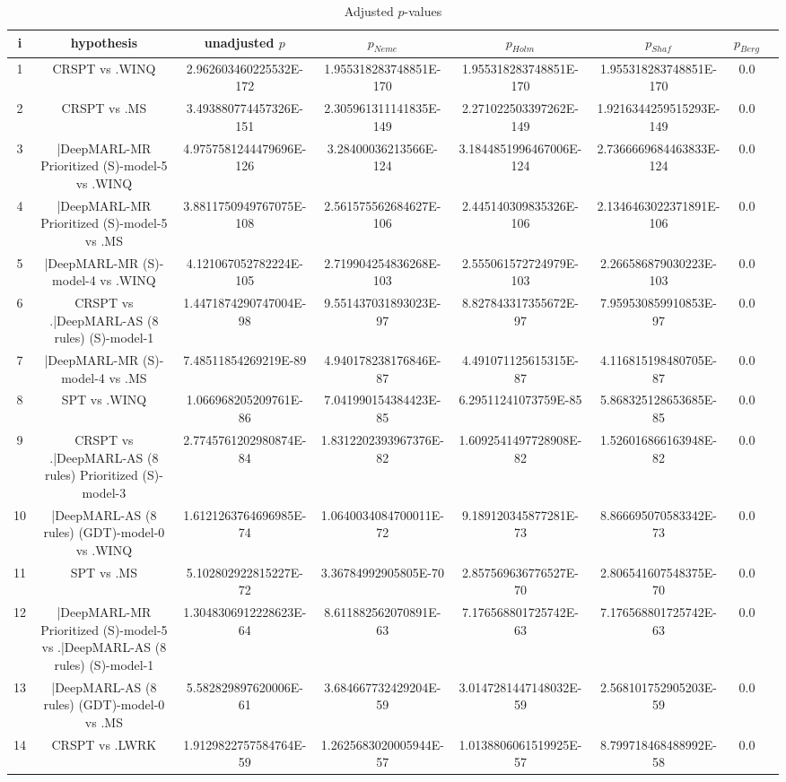\documentclass[a3paper,10pt]{article}
\begin{document}
\begin{table}[!htp]
\centering\tiny
\caption{Adjusted $p$-values}
\begin{tabular}{cccccccc}
i&hypothesis&unadjusted $p$&$p_{Neme}$&$p_{Holm}$&$p_{Shaf}$&$p_{Berg}$\\
\hline
1&CRSPT vs .WINQ&2.962603460225532E-172&1.955318283748851E-170&1.955318283748851E-170&1.955318283748851E-170&0.0\\
2&CRSPT vs .MS&3.493880774457326E-151&2.305961311141835E-149&2.271022503397262E-149&1.9216344259515293E-149&0.0\\
3&|DeepMARL-MR Prioritized (S)-model-5 vs .WINQ&4.9757581244479696E-126&3.28400036213566E-124&3.1844851996467006E-124&2.7366669684463833E-124&0.0\\
4&|DeepMARL-MR Prioritized (S)-model-5 vs .MS&3.8811750949767075E-108&2.561575562684627E-106&2.445140309835326E-106&2.1346463022371891E-106&0.0\\
5&|DeepMARL-MR (S)-model-4 vs .WINQ&4.121067052782224E-105&2.719904254836268E-103&2.555061572724979E-103&2.266586879030223E-103&0.0\\
6&CRSPT vs .|DeepMARL-AS (8 rules) (S)-model-1&1.4471874290747004E-98&9.551437031893023E-97&8.827843317355672E-97&7.959530859910853E-97&0.0\\
7&|DeepMARL-MR (S)-model-4 vs .MS&7.48511854269219E-89&4.940178238176846E-87&4.491071125615315E-87&4.116815198480705E-87&0.0\\
8&SPT vs .WINQ&1.066968205209761E-86&7.041990154384423E-85&6.29511241073759E-85&5.868325128653685E-85&0.0\\
9&CRSPT vs .|DeepMARL-AS (8 rules) Prioritized (S)-model-3&2.7745761202980874E-84&1.8312202393967376E-82&1.6092541497728908E-82&1.526016866163948E-82&0.0\\
10&|DeepMARL-AS (8 rules) (GDT)-model-0 vs .WINQ&1.6121263764696985E-74&1.0640034084700011E-72&9.189120345877281E-73&8.866695070583342E-73&0.0\\
11&SPT vs .MS&5.102802922815227E-72&3.36784992905805E-70&2.857569636776527E-70&2.806541607548375E-70&0.0\\
12&|DeepMARL-MR Prioritized (S)-model-5 vs .|DeepMARL-AS (8 rules) (S)-model-1&1.3048306912228623E-64&8.611882562070891E-63&7.176568801725742E-63&7.176568801725742E-63&0.0\\
13&|DeepMARL-AS (8 rules) (GDT)-model-0 vs .MS&5.582829897620006E-61&3.684667732429204E-59&3.0147281447148032E-59&2.568101752905203E-59&0.0\\
14&CRSPT vs .LWRK&1.9129822757584764E-59&1.2625683020005944E-57&1.0138806061519925E-57&8.799718468488992E-58&0.0\\

\end{tabular}
\end{table}
\end{document}
